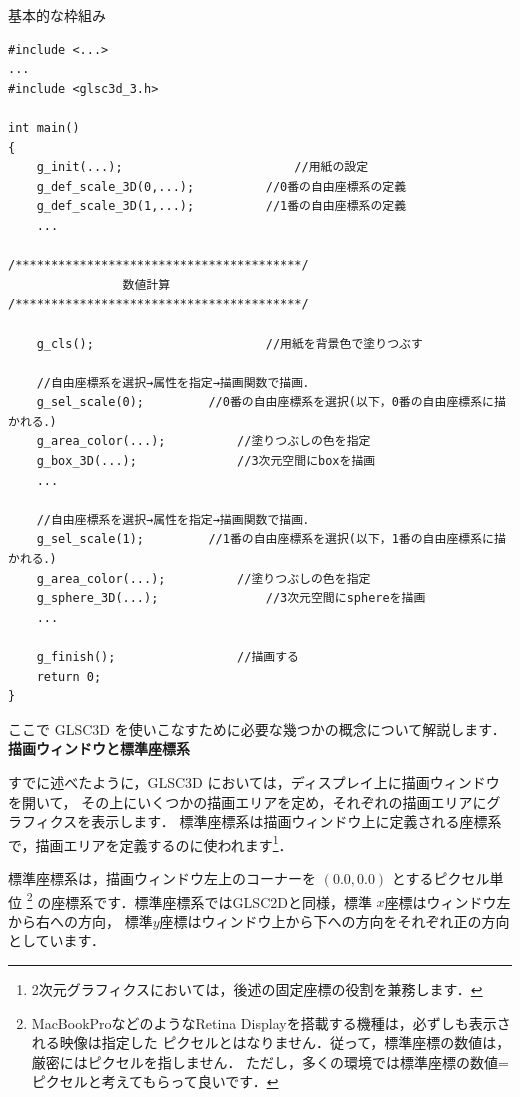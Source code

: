 \documentclass[platex,a4paper,12pt]{jsarticle}%
\begin{document}
\newpage
基本的な枠組み
\begin{verbatim}
#include <...>
...
#include <glsc3d_3.h>

int main()
{
    g_init(...);						//用紙の設定
    g_def_scale_3D(0,...);			//0番の自由座標系の定義
    g_def_scale_3D(1,...);			//1番の自由座標系の定義
    ...
        
/****************************************/	
                数値計算
/****************************************/

    g_cls();						//用紙を背景色で塗りつぶす
   
    //自由座標系を選択→属性を指定→描画関数で描画．
    g_sel_scale(0);			//0番の自由座標系を選択(以下，0番の自由座標系に描かれる．)	
    g_area_color(...);			//塗りつぶしの色を指定
    g_box_3D(...);				//3次元空間にboxを描画
    ...
    
    //自由座標系を選択→属性を指定→描画関数で描画．
    g_sel_scale(1);			//1番の自由座標系を選択(以下，1番の自由座標系に描かれる．)
    g_area_color(...);			//塗りつぶしの色を指定
    g_sphere_3D(...);				//3次元空間にsphereを描画
    ...
           
    g_finish();					//描画する
    return 0;
}

\end{verbatim}
\noindent
ここで GLSC3D を使いこなすために必要な幾つかの概念について解説します．\\

\noindent
{\bf 描画ウィンドウと標準座標系}

すでに述べたように，GLSC3D においては，ディスプレイ上に描画ウィンドウを開いて，
その上にいくつかの描画エリアを定め，それぞれの描画エリアにグラフィクスを表示します．
標準座標系は描画ウィンドウ上に定義される座標系で，描画エリアを定義するのに使われます\footnote{
2次元グラフィクスにおいては，後述の固定座標の役割を兼務します．}．

標準座標系は，描画ウィンドウ左上のコーナーを $(0.0, 0.0)$ とするピクセル単位
\footnote{MacBookProなどのようなRetina Displayを搭載する機種は，必ずしも表示される映像は指定した
ピクセルとはなりません．従って，標準座標の数値は，厳密にはピクセルを指しません．
ただし，多くの環境では標準座標の数値=ピクセルと考えてもらって良いです．}
の座標系です．標準座標系ではGLSC2Dと同様，標準 $x$座標はウィンドウ左から右への方向，
標準$y$座標はウィンドウ上から下への方向をそれぞれ正の方向としています．\\

\end{document}
